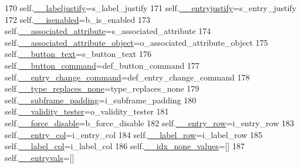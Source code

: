 \begin{DoxyCode}
170         self.\hyperlink{classnegui_1_1pgkeyvalueframe_1_1KeyValFrame_a4f90f379a3925423d76e254e220d7cdb}{\_\_labeljustify}=s\_label\_justify
171         self.\hyperlink{classnegui_1_1pgkeyvalueframe_1_1KeyValFrame_a301c53dce29c99801cd41d85adc4cd5d}{\_\_entryjustify}=s\_entry\_justify
172         self.\hyperlink{classnegui_1_1pgkeyvalueframe_1_1KeyValFrame_a96a6ee2c2af530d26583687d6ad4f75e}{\_\_isenabled}=b\_is\_enabled
173         self.\hyperlink{classnegui_1_1pgkeyvalueframe_1_1KeyValFrame_a816407ab766176b96c4704e6b04ae093}{\_\_associated\_attribute}=s\_associated\_attribute
174         self.\hyperlink{classnegui_1_1pgkeyvalueframe_1_1KeyValFrame_a3bc7265c401db26785fea8c9502a2174}{\_\_associated\_attribute\_object}=o\_associated\_attribute\_object
175         self.\hyperlink{classnegui_1_1pgkeyvalueframe_1_1KeyValFrame_a5eff25aa85ba087f16db456640ea8761}{\_\_button\_text}=s\_button\_text
176         self.\hyperlink{classnegui_1_1pgkeyvalueframe_1_1KeyValFrame_a4b8c159a633099f4c76052e529397739}{\_\_button\_command}=def\_button\_command
177         self.\hyperlink{classnegui_1_1pgkeyvalueframe_1_1KeyValFrame_a0d58985493ae76e481c31574fd813419}{\_\_entry\_change\_command}=def\_entry\_change\_command
178         self.\hyperlink{classnegui_1_1pgkeyvalueframe_1_1KeyValFrame_ad175bbdb1a94e72cd2e0c1d9482fd2a3}{\_\_type\_replaces\_none}=type\_replaces\_none
179         self.\hyperlink{classnegui_1_1pgkeyvalueframe_1_1KeyValFrame_af3f6f22fcd9bc5d4f3633b74169a84e1}{\_\_subframe\_padding}=i\_subframe\_padding
180         self.\hyperlink{classnegui_1_1pgkeyvalueframe_1_1KeyValFrame_a78f462eeca767880558b8e9ae7e4dbb9}{\_\_validity\_tester}=o\_validity\_tester
181         self.\hyperlink{classnegui_1_1pgkeyvalueframe_1_1KeyValFrame_a60d7b1c6d172090d4944d51773bf3092}{\_\_force\_disable}=b\_force\_disable
182         self.\hyperlink{classnegui_1_1pgkeyvalueframe_1_1KeyValFrame_a556d790da8f00002869fbf8cbb1679ad}{\_\_entry\_row}=i\_entry\_row
183         self.\hyperlink{classnegui_1_1pgkeyvalueframe_1_1KeyValFrame_abf71508b243fa605394904b6a960a45e}{\_\_entry\_col}=i\_entry\_col
184         self.\hyperlink{classnegui_1_1pgkeyvalueframe_1_1KeyValFrame_a4f82cb8aeb73bb76bbf1865703c3d5fa}{\_\_label\_row}=i\_label\_row
185         self.\hyperlink{classnegui_1_1pgkeyvalueframe_1_1KeyValFrame_a1e5e52ab782cf38622a8afdbd1dc00ed}{\_\_label\_col}=i\_label\_col
186         self.\hyperlink{classnegui_1_1pgkeyvalueframe_1_1KeyValFrame_ad0c9f91eee034c840986295b8da19b39}{\_\_idx\_none\_values}=[]
187         self.\hyperlink{classnegui_1_1pgkeyvalueframe_1_1KeyValFrame_aa97b894ebab00acf5ff007395d30eb35}{\_\_entryvals}=[]

\end{DoxyCode}
